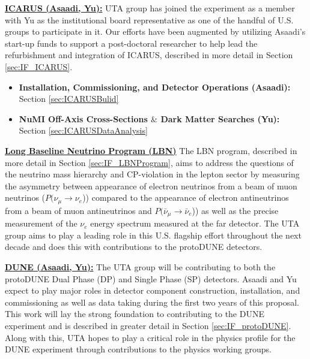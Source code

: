 \noindent \underline{\textbf{ICARUS (Asaadi, Yu):}} UTA group has joined the experiment as a member with Yu as the institutional board representative as one of the handful of U.S. groups to participate in it. Our efforts have been augmented by utilizing Asaadi's start-up funds to support a post-doctoral researcher to help lead the refurbishment and integration of ICARUS, described in more detail in Section \ref{sec:IF_ICARUS}.

\begin{itemize}[noitemsep,nolistsep]
\item{\textbf{Installation, Commissioning, and Detector Operations (Asaadi):}} Section \ref{sec:ICARUSBulid}

\item{\textbf{NuMI Off-Axis Cross-Sections $\&$ Dark Matter Searches (Yu):}} Section \ref{sec:ICARUSDataAnalysis}

\end{itemize}

\noindent \underline{\textbf{Long Baseline Neutrino Program (LBN)}}
The LBN program, described in more detail in Section \ref{sec:IF_LBNProgram}, aims to address the questions of the neutrino mass hierarchy and CP-violation in the lepton sector by measuring the asymmetry between appearance of electron neutrinos from a beam of muon neutrinos ($P(\nu_{\mu} \rightarrow \nu_{e}$)) compared to the appearance of electron antineutrinos from a beam of muon antineutrinos and $P(\bar{\nu}_{\mu} \rightarrow \bar{\nu}_{e}$)) as well as the precise measurement of the $\nu_{e}$ energy spectrum measured at the far detector. The UTA group aims to play a leading role in this U.S. flagship effort throughout the next decade and does this with contributions to the protoDUNE detectors. 

\noindent \textbf{\underline{DUNE (Asaadi, Yu):}} The UTA group will be contributing to both the protoDUNE Dual Phase (DP) and Single Phase (SP) detectors. Asaadi and Yu expect to play major roles in detector component construction, installation, and commissioning as well as data taking during the first two years of this proposal. This work will lay the strong foundation to contributing to the DUNE experiment and is described in greater detail in Section \ref{sec:IF_protoDUNE}. Along with this, UTA hopes to play a critical role in the physics profile for the DUNE experiment through contributions to the physics working groups.

